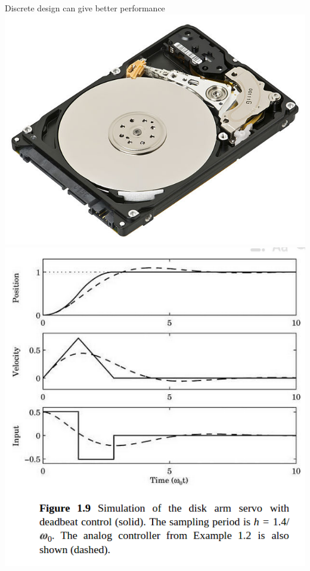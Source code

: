 \documentclass[presentation,aspectratio=169]{beamer}
\begin{document}
\begin{frame}[label={sec:org4ab1a68}]{Discrete design can give better performance}
\includegraphics[height=0.5\textheight]{../../figures/diskdrive.png}
\includegraphics[height=0.8\textheight]{../../figures/fig1-9.png}
\end{frame}
\end{document}
